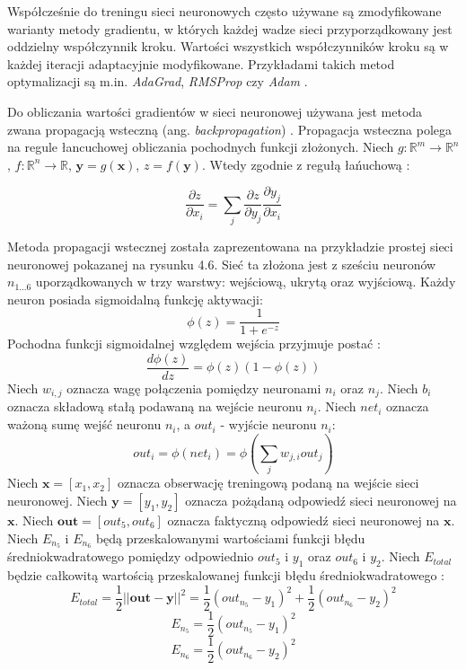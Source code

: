 \documentclass[notitlepage]{report}
\begin{document}
Współcześnie do treningu sieci neuronowych często używane są zmodyfikowane warianty metody gradientu, w których każdej wadze sieci przyporządkowany jest oddzielny współczynnik kroku. Wartości wszystkich współczynników kroku są w każdej iteracji adaptacyjnie modyfikowane. Przykładami takich metod optymalizacji są m.in. \textit{AdaGrad}, \textit{RMSProp} czy \textit{Adam} \cite{duchi} \cite{kingma} \cite{ruder}.

Do obliczania wartości gradientów w sieci neuronowej używana jest metoda zwana propagacją wsteczną (ang. \textit{backpropagation}) \cite{rumelhart}. Propagacja wsteczna polega na regule łancuchowej obliczania pochodnych funkcji złożonych. Niech $g:\mathbb{R}^m \rightarrow \mathbb{R}^n$, $f:\mathbb{R}^n \rightarrow \mathbb{R}$, $\mathbf{y}=g(\mathbf{x})$, $z=f(\mathbf{y})$. Wtedy zgodnie z regułą łańuchową \cite{goodfellow}:

\begin{equation}
\frac{\partial z}{\partial x_i} = \sum_{j}^{}\frac{\partial z}{\partial y_j}\frac{\partial y_j}{\partial x_i}
\end{equation}

Metoda propagacji wstecznej została zaprezentowana na przykładzie prostej sieci neuronowej pokazanej na rysunku 4.6. Sieć ta złożona jest z sześciu neuronów $n_{1...6}$ uporządkowanych w trzy warstwy: wejściową, ukrytą oraz wyjściową. Każdy neuron posiada sigmoidalną funkcję aktywacji:
\begin{equation}
\phi(z) = \frac{1}{1 + e^{-z}}
\end{equation}
Pochodna funkcji sigmoidalnej względem wejścia przyjmuje postać \cite{minai}:
\begin{equation}
\frac{d\phi(z)}{dz} = \phi(z)(1 - \phi(z))
\end{equation}
Niech $w_{i,j}$ oznacza wagę połączenia pomiędzy neuronami $n_i$ oraz $n_j$. Niech $b_i$ oznacza składową stałą podawaną na wejście neuronu $n_i$. Niech $net_i$ oznacza ważoną sumę wejść neuronu $n_i$, a $out_i$ - wyjście neuronu $n_i$:
\begin{equation}
out_i = \phi(net_i) = \phi\left(\sum_{j}^{}w_{j,i}out_j\right)
\end{equation}
Niech $\mathbf{x} = [x_1, x_2]$ oznacza obserwację treningową podaną na wejście sieci neuronowej. Niech $\mathbf{y} = [y_1, y_2]$ oznacza pożądaną odpowiedź sieci neuronowej na $\mathbf{x}$. Niech $\mathbf{out} = [out_5, out_6]$ oznacza faktyczną odpowiedź sieci neuronowej na $\mathbf{x}$. 
Niech $E_{n_5}$ i $E_{n_6}$ będą przeskalowanymi wartościami funkcji błędu średniokwadratowego pomiędzy odpowiednio $out_5$ i $y_1$ oraz $out_6$ i $y_2$. Niech $E_{total}$ będzie całkowitą wartością przeskalowanej funkcji błędu średniokwadratowego \cite{rojas}:
\begin{equation}
E_{total} = \frac{1}{2}||\mathbf{out} - \mathbf{y}||^2 = \frac{1}{2}(out_{n_5} - y_1)^2 + \frac{1}{2}(out_{n_6} - y_2)^2
\end{equation}
\begin{equation}
E_{n_5} = \frac{1}{2}(out_{n_5} - y_1)^2
\end{equation}
\begin{equation}
E_{n_6} = \frac{1}{2}(out_{n_6} - y_2)^2
\end{equation}
\end{document}
